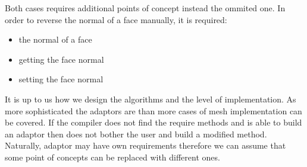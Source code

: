 Both cases requires additional points of concept instead the ommited one.
In order to reverse the normal of a face manually, it is required:

\begin{itemize}
\item the normal of a face
\item getting the face normal
\item setting the face normal
\end{itemize}

It is up to us how we design the algorithms and the level of implementation. As more sophisticated
the adaptors are than more cases of mesh implementation can be covered. If the compiler does not
find the require methods and is able to build an adaptor then does not bother the user and build
a modified method. Naturally, adaptor may have own requirements therefore we can assume that
some point of concepts can be replaced with different ones.